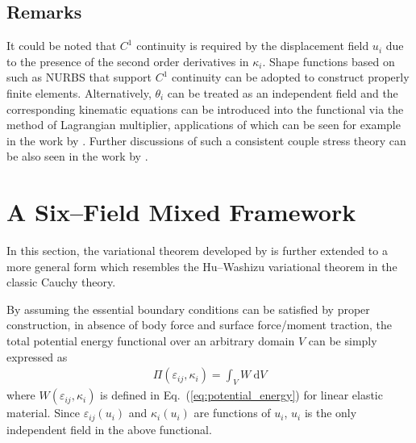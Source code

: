 \documentclass[3p,sort&compress,11pt,fleqn]{elsarticle}
\newcommand*{\eqsref}[1]{Eq.~(\ref{#1})}
\newcommand*{\md}[1]{\mathrm{d}#1}
\begin{document}
\subsection{Remarks}
It could be noted that $C^1$ continuity is required by the displacement field $u_i$ due to the presence of the second order derivatives in $\kappa_i$. Shape functions based on such as NURBS \citep[see][]{Dargush2021} that support $C^1$ continuity can be adopted to construct properly finite elements. Alternatively, $\theta_i$ can be treated as an independent field and the corresponding kinematic equations can be introduced into the functional via the method of Lagrangian multiplier, applications of which can be seen for example in the work by \citet{Darrall2013,Deng2016,Pedgaonkar2021}. Further discussions of such a consistent couple stress theory can be also seen in the work by \citet{Hadjesfandiari2016}.
\section{A Six--Field Mixed Framework}
In this section, the variational theorem developed by \citet{Darrall2013} is further extended to a more general form which resembles the Hu--Washizu variational theorem in the classic Cauchy theory.

By assuming the essential boundary conditions can be satisfied by proper construction, in absence of body force and surface force/moment traction, the total potential energy functional over an arbitrary domain $V$ can be simply expressed as
\begin{gather}
\varPi\left(\varepsilon_{ij},\kappa_i\right)=\int_VW~\md{V}
\end{gather}
where $W\left(\varepsilon_{ij},\kappa_i\right)$ is defined in \eqsref{eq:potential_energy} for linear elastic material. Since $\varepsilon_{ij}\left(u_i\right)$ and $\kappa_i\left(u_i\right)$ are functions of $u_i$, $u_i$ is the only independent field in the above functional.
\end{document}
